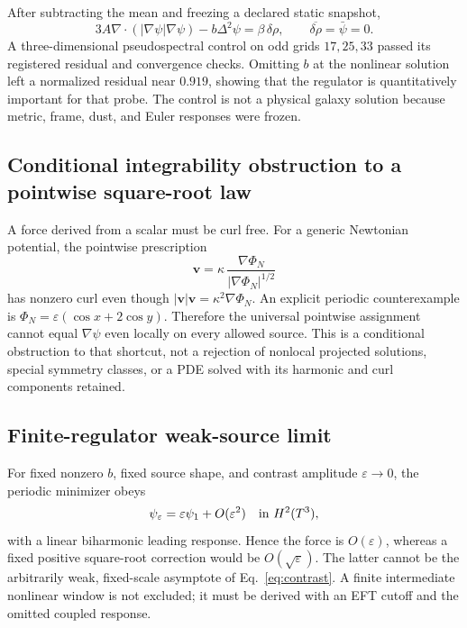 \documentclass[aps,prd,reprint,superscriptaddress,nofootinbib,floatfix]{revtex4-2}
\newcommand{\Tthree}{T^{3}}
\begin{document}
After subtracting the mean and freezing a declared static snapshot,
\begin{equation}
 3A\nabla\!\cdot(|\nabla\psi|\nabla\psi)-b\Delta^2\psi
 =\beta\,\delta\rho,\qquad
 \overline{\delta\rho}=\bar\psi=0.
 \label{eq:contrast}
\end{equation}
A three-dimensional pseudospectral control on odd grids \(17,25,33\) passed
its registered residual and convergence checks.  Omitting \(b\) at the
nonlinear solution left a normalized residual near \(0.919\), showing that the
regulator is quantitatively important for that probe.  The control is not a
physical galaxy solution because metric, frame, dust, and Euler responses were
frozen.

\subsection{Conditional integrability obstruction to a pointwise square-root law}

A force derived from a scalar must be curl free.  For a generic Newtonian
potential, the pointwise prescription
\begin{equation}
 \mathbf v=\kappa\,
 \frac{\nabla\Phi_N}{|\nabla\Phi_N|^{1/2}}
 \label{eq:pointwise}
\end{equation}
has nonzero curl even though
\(|\mathbf v|\mathbf v=\kappa^2\nabla\Phi_N\).
An explicit periodic counterexample is
\(\Phi_N=\varepsilon(\cos x+2\cos y)\).  Therefore the universal pointwise
assignment cannot equal \(\nabla\psi\) even locally on every allowed source.
This is a conditional obstruction to that shortcut, not a rejection of
nonlocal projected solutions, special symmetry classes, or a PDE solved with
its harmonic and curl components retained.

\subsection{Finite-regulator weak-source limit}

For fixed nonzero \(b\), fixed source shape, and contrast amplitude
\(\varepsilon\to0\), the periodic minimizer obeys
\begin{equation}
 \psi_\varepsilon=\varepsilon\psi_1+O(\varepsilon^2)
 \quad\hbox{in }H^2(\Tthree),
 \label{eq:weak-source}
\end{equation}
with a linear biharmonic leading response.  Hence the force is
\(O(\varepsilon)\), whereas a fixed positive square-root correction would be
\(O(\sqrt\varepsilon)\).  The latter cannot be the arbitrarily weak,
fixed-scale asymptote of Eq.~\eqref{eq:contrast}.  A finite intermediate
nonlinear window is not excluded; it must be derived with an EFT cutoff and
the omitted coupled response.
\end{document}
